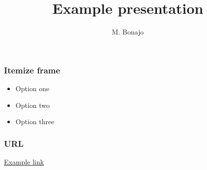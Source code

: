 \documentclass[aspectratio=169]{beamer}
\title{Example presentation}
\institute[FHTenL]{}
\author{M. Bonajo}
\begin{document}
\frame{\titlepage}

\begin{frame}
    \frametitle{Itemize frame}

    \begin{itemize}
        \item Option one
        \item Option two
        \item Option three
    \end{itemize}

\end{frame}

\begin{frame}
    \frametitle{URL}
    \href{http://www.example.com}{Example link}

\end{frame}
\end{document}
